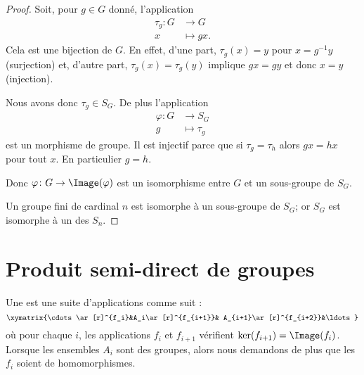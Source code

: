 \begin{proof}
    Soit, pour \( g\in G\) donné, l'application
    \begin{equation}
        \begin{aligned}
            \tau_g\colon G&\to G \\
            x&\mapsto gx.
        \end{aligned}
    \end{equation}
    Cela est une bijection de \( G\). En effet, d'une part, \( \tau_g(x)=y\) pour \( x=g^{-1} y\) (surjection) et, d'autre part, \( \tau_g(x)=\tau_g(y)\) implique \( gx=gy\) et donc \( x=y\) (injection).

    Nous avons donc \( \tau_g\in S_G\). De plus l'application
    \begin{equation}
        \begin{aligned}
            \varphi\colon G&\to S_G \\
            g&\mapsto \tau_g
        \end{aligned}
    \end{equation}
    est un morphisme de groupe. Il est injectif parce que si \( \tau_g=\tau_h\) alors \( gx=hx\) pour tout \( x\). En particulier \( g=h\).

    Donc \( \varphi\colon G\to \Image(\varphi)\) est un isomorphisme entre \( G\) et un sous-groupe de \( S_G\).

    Un groupe fini de cardinal \( n\) est isomorphe à un sous-groupe de \( S_G\); or \( S_G\) est isomorphe à un des \( S_n\).
\end{proof}

\section{Produit semi-direct de groupes}

\begin{definition}
    Une  est une suite d'applications comme suit :
    \begin{equation}
        \xymatrix{%
        \cdots \ar[r]^{f_i}&A_i\ar[r]^{f_{i+1}}& A_{i+1}\ar[r]^{f_{i+2}}&\ldots
           }
    \end{equation}
    où pour chaque \( i\), les applications \( f_i\) et \( f_{i+1}\) vérifient \( \ker(f_{i+1})=\Image(f_i)\). Lorsque les ensembles \( A_i\) sont des groupes, alors nous demandons de plus que les \( f_i\) soient de homomorphismes.
\end{definition}

